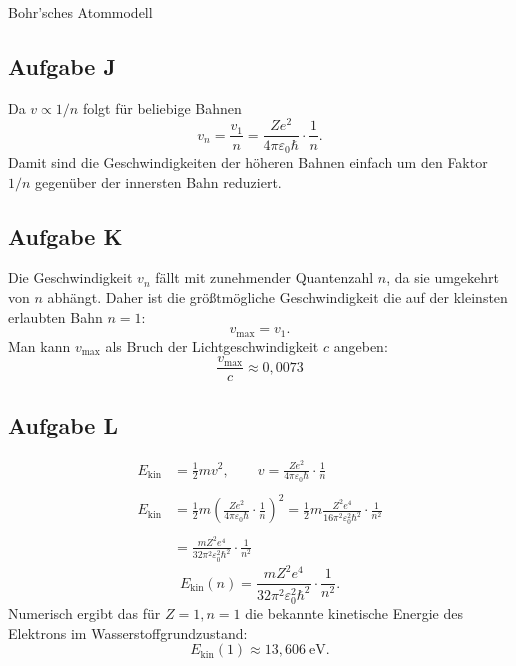 \documentclass[11pt,a4paper,oneside]{article}
\begin{document}
	\begin{loesung}{Bohr'sches Atommodell}
		\subsection*{Aufgabe J}
		Da \(v\propto 1/n\) folgt für beliebige Bahnen
		\[
		\boxed{v_n = \frac{v_1}{n} = \frac{Z e^2}{4\pi\varepsilon_0\hbar}\cdot\frac{1}{n}.}
		\]
		Damit sind die Geschwindigkeiten der höheren Bahnen einfach um den Faktor \(1/n\) gegenüber der innersten Bahn reduziert.\\
		\subsection*{Aufgabe K}
		Die Geschwindigkeit \(v_n\) fällt mit zunehmender Quantenzahl \(n\), da sie umgekehrt von \(n\) abhängt. Daher ist die größtmögliche Geschwindigkeit die auf der kleinsten erlaubten Bahn \(n=1\):
		\[
		v_\text{max} = v_1.
		\]
		Man kann \(v_\text{max}\) als Bruch der Lichtgeschwindigkeit \(c\) angeben:
		\[
		\boxed{\frac{v_\text{max}}{c} \approx 0{,}0073}
		\]
		\subsection*{Aufgabe L}
		\begin{align*}
			E_\text{kin} &= \frac{1}{2} m v^2, \qquad
			v = \frac{Z e^2}{4 \pi \varepsilon_0 \hbar} \cdot \frac{1}{n} \\\\
			E_\text{kin} &= \frac{1}{2} m \left(\frac{Z e^2}{4 \pi \varepsilon_0 \hbar} \cdot \frac{1}{n}\right)^2 = \frac{1}{2} m \frac{Z^2 e^4}{16 \pi^2 \varepsilon_0^2 \hbar^2} \cdot \frac{1}{n^2} \\\\
			&= \frac{m Z^2 e^4}{32 \pi^2 \varepsilon_0^2 \hbar^2} \cdot \frac{1}{n^2}
		\end{align*}
		\[
		\boxed{E_\text{kin}(n) = \frac{m Z^2 e^4}{32 \pi^2 \varepsilon_0^2 \hbar^2} \cdot \frac{1}{n^2}}.
		\]
		Numerisch ergibt das für \(Z=1, n=1\) die bekannte kinetische Energie des Elektrons im Wasserstoffgrundzustand:
		\[
		E_\text{kin}(1) \approx 13{,}606\ \mathrm{eV}.
		\]
	\end{loesung}
	\newpage
	
\end{document}
